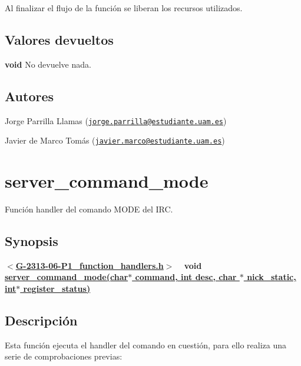 Al finalizar el flujo de la función se liberan los recursos utilizados.\hypertarget{server_command_kick_return_kick}{}\subsection{Valores devueltos}\label{server_command_kick_return_kick}

\begin{DoxyItemize}
\item {\bfseries void} No devuelve nada. 
\end{DoxyItemize}\hypertarget{server_command_kick_authors_kick}{}\subsection{Autores}\label{server_command_kick_authors_kick}

\begin{DoxyItemize}
\item Jorge Parrilla Llamas (\href{mailto:jorge.parrilla@estudiante.uam.es}{\tt jorge.\+parrilla@estudiante.\+uam.\+es}) 
\item Javier de Marco Tomás (\href{mailto:javier.marco@estudiante.uam.es}{\tt javier.\+marco@estudiante.\+uam.\+es}) 
\end{DoxyItemize}\hypertarget{server_command_mode}{}\section{server\+\_\+command\+\_\+mode}\label{server_command_mode}
Función handler del comando M\+O\+DE del I\+RC.\hypertarget{server_command_mode_synopsis_mode}{}\subsection{Synopsis}\label{server_command_mode_synopsis_mode}
{ {\bfseries $<$\hyperlink{G-2313-06-P1__function__handlers_8h}{G-\/2313-\/06-\/\+P1\+\_\+function\+\_\+handlers.\+h}$>$} ~\newline
 {\bfseries void \hyperlink{G-2313-06-P1__function__handlers_8c_a44a8736512c1df49d94c8194ae9b8a50}{server\+\_\+command\+\_\+mode(char$\ast$ command, int desc, char $\ast$ nick\+\_\+static, int$\ast$ register\+\_\+status)}} } \hypertarget{server_command_mode_descripcion_mode}{}\subsection{Descripción}\label{server_command_mode_descripcion_mode}
Esta función ejecuta el handler del comando en cuestión, para ello realiza una serie de comprobaciones previas\+:


